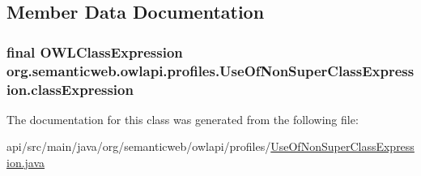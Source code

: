 \subsection{Member Data Documentation}
\hypertarget{classorg_1_1semanticweb_1_1owlapi_1_1profiles_1_1_use_of_non_super_class_expression_a35313e1946ed43a5166c82c92af0b097}{
\subsubsection[{class\-Expression}]{\setlength{\rightskip}{0pt plus 5cm}final {\bf O\-W\-L\-Class\-Expression} org.\-semanticweb.\-owlapi.\-profiles.\-Use\-Of\-Non\-Super\-Class\-Expression.\-class\-Expression\hspace{0.3cm}{\ttfamily [private]}}}\label{classorg_1_1semanticweb_1_1owlapi_1_1profiles_1_1_use_of_non_super_class_expression_a35313e1946ed43a5166c82c92af0b097}


The documentation for this class was generated from the following file\-:\begin{DoxyCompactItemize}
\item 
api/src/main/java/org/semanticweb/owlapi/profiles/\hyperlink{_use_of_non_super_class_expression_8java}{Use\-Of\-Non\-Super\-Class\-Expression.\-java}\end{DoxyCompactItemize}
